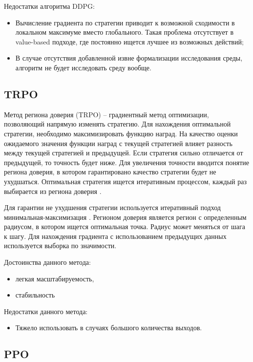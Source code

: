 Недостатки алгоритма DDPG:
\begin{itemize}
	\item Вычисление градиента по стратегии приводит к возможной сходимости в локальном максимуме вместо глобального. Такая проблема отсутствует в value-based подходе, где постоянно ищется лучшее из возможных действий;
	\item В случае отсутствия добавленной извне формализации исследования среды, алгоритм не будет исследовать среду вообще.
\end{itemize}

\subsection{TRPO}
Метод региона доверия (TRPO) -- градиентный метод оптимизации, позволяющий напрямую изменять стратегию. 
Для нахождения оптимальной стратегии, необходимо максимизировать функцию наград. 
На качество оценки ожидаемого значения функции наград с текущей стратегией влияет разность между текущей стратегией и предыдущей. 
Если стратегия сильно отличается от предыдущей, то точность будет ниже. 
Для увеличения точности вводится понятие региона доверия, в котором гарантировано качество стратегии будет не ухудшаться. 
Оптимальная стратегия ищется итеративным процессом, каждый раз выбирается из региона доверия \cite{trpo}.

Для гарантии не ухудшения стратегии используется итеративный подход минимальная-максимизация \cite{trpo1}.
Регионом доверия является регион с определенным радиусом, в котором ищется оптимальная точка. 
Радиус может меняться от шага к шагу. Для нахождения градиента с использованием предыдущих данных используется выборка по значимости.

Достоинства данного метода:
\begin{itemize}
	\item легкая масштабируемость,
	\item стабильность
\end{itemize}

Недостатки данного метода:
\begin{itemize}
	\item Тяжело использовать в случаях большого количества выходов.
\end{itemize}


\subsection{PPO}

